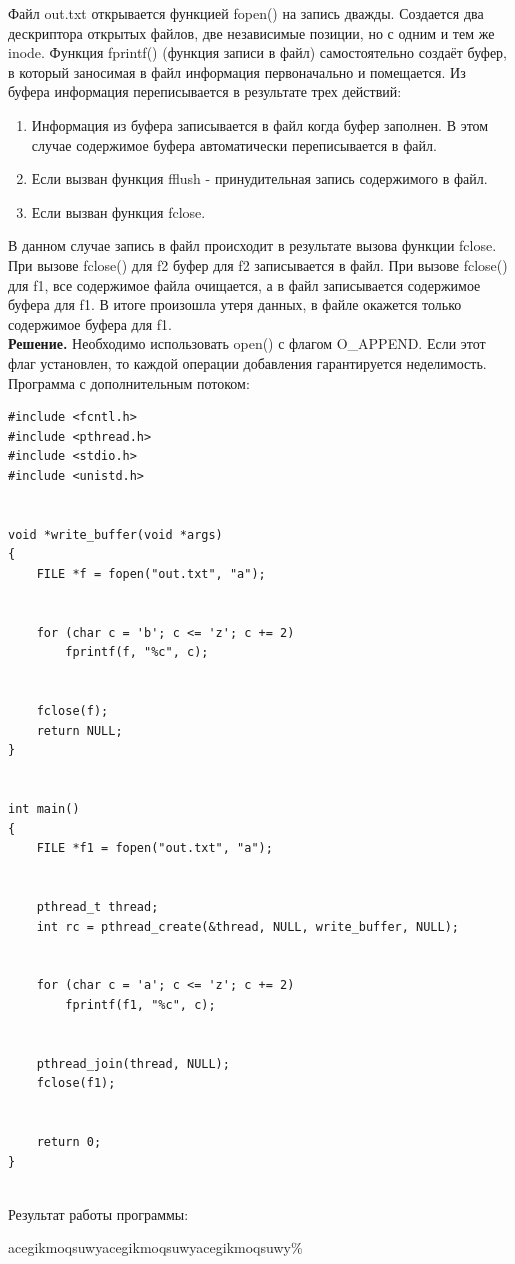 Файл out.txt открывается функцией fopen() на запись дважды. Создается два
дескриптора открытых файлов, две независимые позиции, но с одним и тем же
inode. Функция fprintf() (функция записи в файл) самостоятельно создаёт буфер,
в который заносимая в файл информация первоначально и помещается. Из буфера
информация переписывается в результате трех действий:
\begin{enumerate}
  \item Информация из буфера записывается в файл когда буфер заполнен. В
        этом случае содержимое буфера автоматически переписывается в файл.
  \item Если вызван функция fflush - принудительная запись содержимого в файл.
  \item Если вызван функция fclose.
\end{enumerate}
В данном случае запись в файл происходит в результате вызова функции fclose.
При вызове fclose() для f2 буфер для f2 записывается в файл. При вызове
fclose() для f1, все содержимое файла очищается, а в файл записывается
содержимое буфера для f1. В итоге произошла утеря данных, в файле окажется
только содержимое буфера для f1. \\
\textbf{Решение.} Необходимо использовать open() с флагом O\_APPEND. Если этот
флаг установлен, то каждой операции добавления гарантируется неделимость. \\
Программа с дополнительным потоком:\newpage
\begin{lstlisting}
#include <fcntl.h>
#include <pthread.h>
#include <stdio.h>
#include <unistd.h>


void *write_buffer(void *args)
{
    FILE *f = fopen("out.txt", "a");


    for (char c = 'b'; c <= 'z'; c += 2)
        fprintf(f, "%c", c);


    fclose(f);
    return NULL;
}


int main()
{
    FILE *f1 = fopen("out.txt", "a");


    pthread_t thread;
    int rc = pthread_create(&thread, NULL, write_buffer, NULL);


    for (char c = 'a'; c <= 'z'; c += 2)
        fprintf(f1, "%c", c);


    pthread_join(thread, NULL);
    fclose(f1);


    return 0;
}
  
\end{lstlisting}
Результат работы программы:

acegikmoqsuwyacegikmoqsuwyacegikmoqsuwy\%

